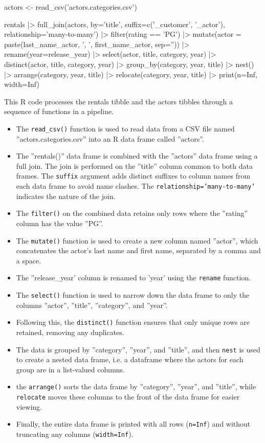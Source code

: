 \begin{samepage}
\begin{Rcode}
actors <- read_csv('actors.categories.csv')

rentals |> 
  full_join(actors, by='title', 
    suffix=c('_customer', '_actor'), 
    relationship='many-to-many') |>
  filter(rating == 'PG') |>
  mutate(actor = 
    paste(last_name_actor, ', ', first_name_actor, sep='')) |>
  rename(year=release_year) |>
  select(actor, title, category, year) |>
  distinct(actor, title, category, year) |>
  group_by(category, year, title) |> 
  nest() |>
  arrange(category, year, title) |>
  relocate(category, year, title) |>
  print(n=Inf, width=Inf)
\end{Rcode}
\end{samepage}

This R code processes the rentals tibble and the actors tibbles through a sequence of functions in a pipeline.
\begin{itemize}
\item The \texttt{read\_csv()} function is used to read data from a CSV file named ''actors.categories.csv'' into an R data frame called ''actors''.
\item The ''rentals()'' data frame is combined with the ''actors'' data frame using a full join. The join is performed on the ''title'' column common to both data frames. The \texttt{suffix} argument adds distinct suffixes to column names from each data frame to avoid name clashes. The \texttt{relationship='many-to-many'} indicates the nature of the join.
\item The \texttt{filter()} on the combined data retains only rows where the ''rating'' column has the value ''PG''.
\item The \texttt{mutate()} function is used to create a new column named ''actor'', which concatenates the actor's last name and first name, separated by a comma and a space.
\item The ''release\_year' column is renamed to 'year' using the \texttt{rename} function.
\item The \texttt{select()} function is used to narrow down the data frame to only the columns ''actor'', ''title'', ''category'', and ''year''. 
\item Following this, the \texttt{distinct()} function ensures that only unique rows are retained, removing any duplicates.
\item The data is grouped by ''category'', ''year'', and ''title'', and then \texttt{nest} is used to create a nested data frame, i.e. a dataframe where the actors for each group are in a list-valued columns.
\item the \texttt{arrange()} sorts the data frame by ''category'', ''year'', and ''title'', while \texttt{relocate} moves these columns to the front of the data frame for easier viewing.
\item Finally, the entire data frame is printed with all rows (\texttt{n=Inf}) and without truncating any columns (\texttt{width=Inf}).
\end{itemize}


